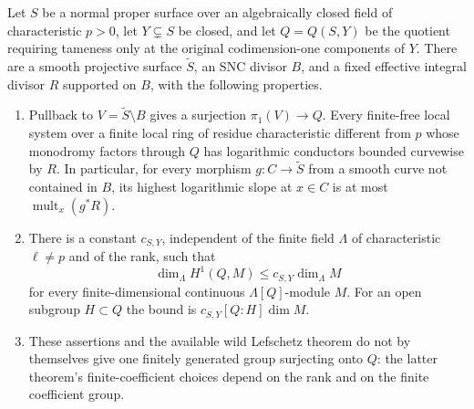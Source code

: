 \begin{proposition}
\label{D:surface-curvewise-conductor}
Let $S$ be a normal proper surface over an algebraically closed field
of characteristic $p>0$, let $Y\subsetneq S$ be closed, and let
$Q=Q(S,Y)$ be the quotient requiring tameness only at the original
codimension-one components of $Y$. There are a smooth projective
surface $\widetilde S$, an SNC divisor $B$, and a fixed effective
integral divisor $R$ supported on $B$, with the following properties.
\begin{enumerate}
\item Pullback to $V=\widetilde S\setminus B$ gives a surjection
$\pi_1(V)\to Q$. Every finite-free local system over a finite local
ring of residue characteristic different from $p$ whose monodromy
factors through $Q$ has logarithmic conductors bounded curvewise by
$R$. In particular, for every morphism $g:C\to\widetilde S$ from a
smooth curve not contained in $B$, its highest logarithmic slope at
$x\in C$ is at most $\operatorname{mult}_x(g^*R)$.
\item There is a constant $c_{S,Y}$, independent of the finite field
$\Lambda$ of characteristic $\ell\ne p$ and of the rank, such that
\[
 \dim_\Lambda H^1(Q,M)\le c_{S,Y}\dim_\Lambda M
\]
for every finite-dimensional continuous $\Lambda[Q]$-module $M$.
For an open subgroup $H\subset Q$ the bound is
$c_{S,Y}[Q:H]\dim M$.
\item These assertions and the available wild Lefschetz theorem do
not by themselves give one finitely generated group surjecting onto
$Q$: the latter theorem's finite-coefficient choices depend on the
rank and on the finite coefficient group.
\end{enumerate}
\end{proposition}
